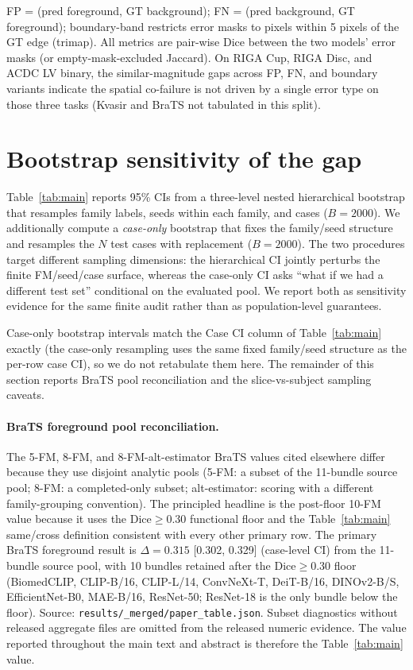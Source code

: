 FP = (pred foreground, GT background); FN = (pred background, GT foreground); boundary-band restricts error masks to pixels within 5 pixels of the GT edge (trimap). All metrics are pair-wise Dice between the two models' error masks (or empty-mask-excluded Jaccard). On RIGA Cup, RIGA Disc, and ACDC LV binary, the similar-magnitude gaps across FP, FN, and boundary variants indicate the spatial co-failure is not driven by a single error type on those three tasks (Kvasir and BraTS not tabulated in this split).

\section{Bootstrap sensitivity of the gap}
\label{sec:bootstrap}

Table~\ref{tab:main} reports 95\% CIs from a three-level nested hierarchical bootstrap that resamples family labels, seeds within each family, and cases ($B{=}2000$). We additionally compute a \emph{case-only} bootstrap that fixes the family/seed structure and resamples the $N$ test cases with replacement ($B{=}2000$). The two procedures target different sampling dimensions: the hierarchical CI jointly perturbs the finite FM/seed/case surface, whereas the case-only CI asks ``what if we had a different test set'' conditional on the evaluated pool. We report both as sensitivity evidence for the same finite audit rather than as population-level guarantees.

Case-only bootstrap intervals match the Case CI column of Table~\ref{tab:main} exactly (the case-only resampling uses the same fixed family/seed structure as the per-row case CI), so we do not retabulate them here. The remainder of this section reports BraTS pool reconciliation and the slice-vs-subject sampling caveats.

\paragraph{BraTS foreground pool reconciliation.} The 5-FM, 8-FM, and 8-FM-alt-estimator BraTS values cited elsewhere differ because they use disjoint analytic pools (5-FM: a subset of the 11-bundle source pool; 8-FM: a completed-only subset; alt-estimator: scoring with a different family-grouping convention). The principled headline is the post-floor 10-FM value because it uses the Dice${\geq}0.30$ functional floor and the Table~\ref{tab:main} same/cross definition consistent with every other primary row. The primary BraTS foreground result is $\Delta{=}0.315$ [0.302, 0.329] (case-level CI) from the 11-bundle source pool, with 10 bundles retained after the Dice$\geq$0.30 floor (BiomedCLIP, CLIP-B/16, CLIP-L/14, ConvNeXt-T, DeiT-B/16, DINOv2-B/S, EfficientNet-B0, MAE-B/16, ResNet-50; ResNet-18 is the only bundle below the floor). Source: \texttt{results/\_merged/paper\_table.json}. Subset diagnostics without released aggregate files are omitted from the released numeric evidence. The value reported throughout the main text and abstract is therefore the Table~\ref{tab:main} value.

